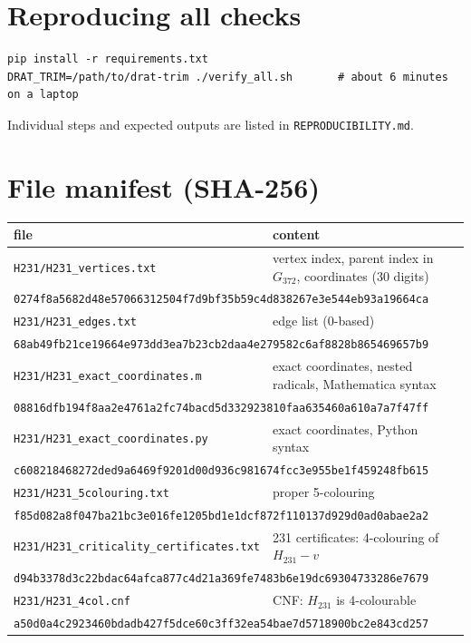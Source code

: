 \documentclass[10pt]{article}
\begin{document}
\section{Reproducing all checks}
\begin{verbatim}
pip install -r requirements.txt
DRAT_TRIM=/path/to/drat-trim ./verify_all.sh       # about 6 minutes on a laptop
\end{verbatim}
Individual steps and expected outputs are listed in \texttt{REPRODUCIBILITY.md}.

\section{File manifest (SHA-256)}
{\small
\begin{longtable}{p{}p{}}
\toprule
file & content\\
\midrule
\texttt{H231/H231\_vertices.txt} & vertex index, parent index in $G_{372}$, coordinates (30 digits) \\ \multicolumn{2}{l}{\scriptsize\texttt{0274f8a5682d48e57066312504f7d9bf35b59c4d838267e3e544eb93a19664ca}} \\
\texttt{H231/H231\_edges.txt} & edge list (0-based) \\ \multicolumn{2}{l}{\scriptsize\texttt{68ab49fb21ce19664e973dd3ea7b23cb2daa4e279582c6af8828b865469657b9}} \\
\texttt{H231/H231\_exact\_coordinates.m} & exact coordinates, nested radicals, Mathematica syntax \\ \multicolumn{2}{l}{\scriptsize\texttt{08816dfb194f8aa2e4761a2fc74bacd5d332923810faa635460a610a7a7f47ff}} \\
\texttt{H231/H231\_exact\_coordinates.py} & exact coordinates, Python syntax \\ \multicolumn{2}{l}{\scriptsize\texttt{c608218468272ded9a6469f9201d00d936c981674fcc3e955be1f459248fb615}} \\
\texttt{H231/H231\_5colouring.txt} & proper 5-colouring \\ \multicolumn{2}{l}{\scriptsize\texttt{f85d082a8f047ba21bc3e016fe1205bd1e1dcf872f110137d929d0ad0abae2a2}} \\
\texttt{H231/H231\_criticality\_certificates.txt} & 231 certificates: 4-colouring of $H_{231}-v$ \\ \multicolumn{2}{l}{\scriptsize\texttt{d94b3378d3c22bdac64afca877c4d21a369fe7483b6e19dc69304733286e7679}} \\
\texttt{H231/H231\_4col.cnf} & CNF: $H_{231}$ is 4-colourable \\ \multicolumn{2}{l}{\scriptsize\texttt{a50d0a4c2923460bdadb427f5dce60c3ff32ea54bae7d5718900bc2e843cd257}} \\

\end{longtable}}
\end{document}
